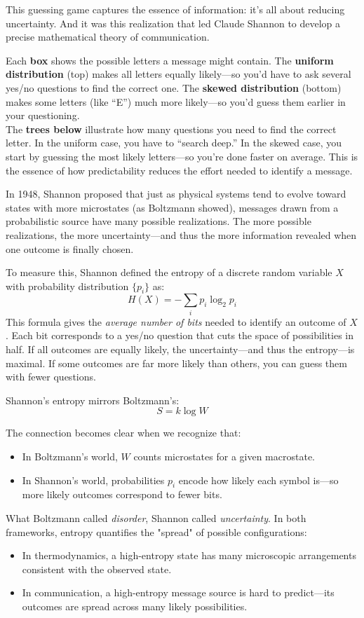 This guessing game captures the essence of information: it’s all about reducing uncertainty. And it was this realization that led Claude Shannon to develop a precise mathematical theory of communication.

Each \textbf{box} shows the possible letters a message might contain. The \textbf{uniform distribution} (top) makes all letters equally likely—so you'd have to ask several yes/no questions to find the correct one. The \textbf{skewed distribution} (bottom) makes some letters (like “E”) much more likely—so you’d guess them earlier in your questioning.
\\
The \textbf{trees below} illustrate how many questions you need to find the correct letter. In the uniform case, you have to “search deep.” In the skewed case, you start by guessing the most likely letters—so you're done faster on average. This is the essence of how predictability reduces the effort needed to identify a message.

In 1948, Shannon proposed that just as physical systems tend to evolve toward states with more microstates (as Boltzmann showed), messages drawn from a probabilistic source have many possible realizations. The more possible realizations, the more uncertainty—and thus the more information revealed when one outcome is finally chosen.

To measure this, Shannon defined the entropy of a discrete random variable \( X \) with probability distribution \( \{p_i\} \) as:
\[
H(X) = -\sum_i p_i \log_2 p_i
\]
This formula gives the \emph{average number of bits} needed to identify an outcome of \( X \). Each bit corresponds to a yes/no question that cuts the space of possibilities in half. If all outcomes are equally likely, the uncertainty—and thus the entropy—is maximal. If some outcomes are far more likely than others, you can guess them with fewer questions.

Shannon’s entropy mirrors Boltzmann’s:
\[
S = k \log W
\]



The connection becomes clear when we recognize that:
\begin{itemize}
  \item In Boltzmann’s world, \( W \) counts microstates for a given macrostate.
  \item In Shannon’s world, probabilities \( p_i \) encode how likely each symbol is—so more likely outcomes correspond to fewer bits.
\end{itemize}

What Boltzmann called \emph{disorder}, Shannon called \emph{uncertainty}. In both frameworks, entropy quantifies the "spread" of possible configurations:
\begin{itemize}
  \item In thermodynamics, a high-entropy state has many microscopic arrangements consistent with the observed state.
  \item In communication, a high-entropy message source is hard to predict—its outcomes are spread across many likely possibilities.
\end{itemize}


